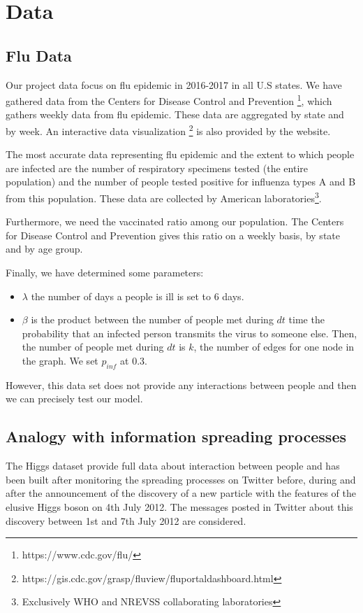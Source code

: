 \section{Data}
\subsection{Flu Data}

Our project data focus on flu epidemic in 2016-2017 in all U.S states.
 We have gathered data from the Centers for Disease Control and Prevention \footnote{https://www.cdc.gov/flu/}, which gathers weekly data from flu epidemic. These data are aggregated by state and by week.
 An interactive data visualization \footnote{https://gis.cdc.gov/grasp/fluview/fluportaldashboard.html} is also provided by the website.
 
 The most accurate data representing flu epidemic and the extent to which people are infected are the number of respiratory specimens tested (the entire population) and the number of people tested positive for influenza types A and B from this population.
 These data are collected by American laboratories\footnote{Exclusively WHO and NREVSS collaborating laboratories}.
 
 Furthermore, we need the vaccinated ratio among our population. The Centers for Disease Control and Prevention gives this ratio on a weekly basis, by state and by age group.
 
 Finally, we have determined some parameters:
 \begin{itemize}
     \item $\lambda$ the number of days a people is ill is set to 6 days.
     \item $\beta$ is the product between the number of people met during $dt$ time the probability that an infected person transmits the virus to someone else. Then, the number of people met during $dt$ is $k$, the number of edges for one node in the graph. We set $p_{inf}$ at 0.3.
\end{itemize}

However, this data set does not provide any interactions between people and then we can precisely test our model.

\subsection{Analogy with information spreading processes}

The Higgs dataset
provide full data about interaction between people and has been built after monitoring the spreading processes on Twitter before, during and after the announcement of the discovery of a new particle with the features of the elusive Higgs boson on 4th July 2012. The messages posted in Twitter about this discovery between 1st and 7th July 2012 are considered.

